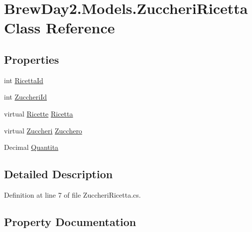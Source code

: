\hypertarget{class_brew_day2_1_1_models_1_1_zuccheri_ricetta}{}\section{Brew\+Day2.\+Models.\+Zuccheri\+Ricetta Class Reference}
\label{class_brew_day2_1_1_models_1_1_zuccheri_ricetta}
\subsection*{Properties}
\begin{DoxyCompactItemize}
\item 
int \mbox{\hyperlink{class_brew_day2_1_1_models_1_1_zuccheri_ricetta_a61cb724bda708fe613ac795d03534c40}{Ricetta\+Id}}
\item 
int \mbox{\hyperlink{class_brew_day2_1_1_models_1_1_zuccheri_ricetta_a4a18160de16932d79fe8d6405d69564c}{Zuccheri\+Id}}
\item 
virtual \mbox{\hyperlink{class_brew_day2_1_1_models_1_1_ricette}{Ricette}} \mbox{\hyperlink{class_brew_day2_1_1_models_1_1_zuccheri_ricetta_aff5611b7bc51ecf9dd5e3a72053387a7}{Ricetta}}
\item 
virtual \mbox{\hyperlink{class_brew_day2_1_1_models_1_1_zuccheri}{Zuccheri}} \mbox{\hyperlink{class_brew_day2_1_1_models_1_1_zuccheri_ricetta_abbb04536ee8b95032c945920da5c67e7}{Zucchero}}
\item 
Decimal \mbox{\hyperlink{class_brew_day2_1_1_models_1_1_zuccheri_ricetta_a399490a19129196cb23ec6a968d46172}{Quantita}}
\end{DoxyCompactItemize}


\subsection{Detailed Description}


Definition at line 7 of file Zuccheri\+Ricetta.\+cs.



\subsection{Property Documentation}
\mbox{\label{class_brew_day2_1_1_models_1_1_zuccheri_ricetta_a399490a19129196cb23ec6a968d46172}} 
